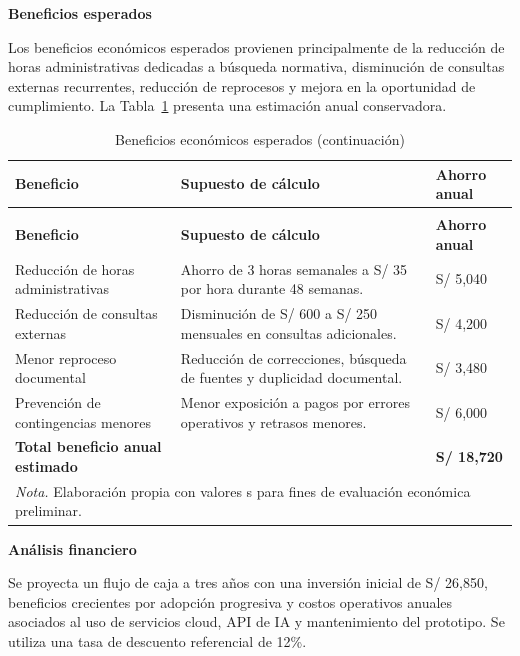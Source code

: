 \documentclass[12pt,a4paper,oneside]{report}
\begin{document}
\textbf{Beneficios esperados}

Los beneficios económicos esperados provienen principalmente de la reducción de horas administrativas dedicadas a búsqueda normativa, disminución de consultas externas recurrentes, reducción de reprocesos y mejora en la oportunidad de cumplimiento. La Tabla~\ref{tab:beneficios-esperados} presenta una estimación anual conservadora.

\begin{longtable}{@{}p{}p{}p{}@{}}
\caption{Beneficios económicos esperados}\label{tab:beneficios-esperados}\\
\toprule
\textbf{Beneficio} & \textbf{Supuesto de cálculo} & \textbf{Ahorro anual} \\
\midrule
\endfirsthead
\caption[]{Beneficios económicos esperados (continuación)}\\
\toprule
\textbf{Beneficio} & \textbf{Supuesto de cálculo} & \textbf{Ahorro anual} \\
\midrule
\endhead
Reducción de horas administrativas & Ahorro de 3 horas semanales a S/ 35 por hora durante 48 semanas. & S/ 5,040 \\
Reducción de consultas externas & Disminución de S/ 600 a S/ 250 mensuales en consultas adicionales. & S/ 4,200 \\
Menor reproceso documental & Reducción de correcciones, búsqueda de fuentes y duplicidad documental. & S/ 3,480 \\
Prevención de contingencias menores & Menor exposición a pagos por errores operativos y retrasos menores. & S/ 6,000 \\
\textbf{Total beneficio anual estimado} & & \textbf{S/ 18,720} \\
\bottomrule
\multicolumn{3}{p{0.94\textwidth}}{\normalsize \textit{Nota.} Elaboración propia con valores s para fines de evaluación económica preliminar.}\\
\end{longtable}

\textbf{Análisis financiero}

Se proyecta un flujo de caja a tres años con una inversión inicial de S/ 26,850, beneficios crecientes por adopción progresiva y costos operativos anuales asociados al uso de servicios cloud, API de IA y mantenimiento del prototipo. Se utiliza una tasa de descuento referencial de 12\%.
\end{document}
